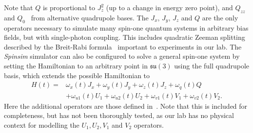 \documentclass{jors}
\begin{document}
		Note that $ Q $ is proportional to $ J_z^2 $ (up to a change in energy zero point), and $ Q_{zz} $~\cite{hamley_spin-nematic_2012} and $ Q_0 $~\cite{di_dipolequadrupole_2010} from alternative quadrupole bases.
		The $ J_x $, $ J_y $, $ J_z $ and $ Q $ are the only operators necessary to simulate many spin-one quantum systems in arbitrary bias fields, but with single-photon coupling.
		This includes quadratic Zeeman splitting described by the Breit-Rabi formula~\cite{mockler_atomic_1961} important to experiments in our lab.
		The \emph{Spinsim} simulator can also be configured to solve a general spin-one system by setting the Hamiltonian to an arbitrary point in $ \mathfrak{su}(3) $ using the full quadrupole basis, which extends the possible Hamiltonian to
		\begin{align}
			H(t) =& \omega_x(t) J_x + \omega_y(t) J_y + \omega_z(t) J_z + \omega_q(t) Q\nonumber\\
			&+ \omega_{u1}(t) U_1 + \omega_{u2}(t) U_2 + \omega_{v1}(t) V_1 + \omega_{v2}(t) V_2.
		\end{align}
		Here the additional operators are those defined in~\cite{di_dipolequadrupole_2010}. Note that this is included for completeness, but has not been thoroughly tested, as our lab has no physical context for modelling the $ U_1, U_2, V_1 $ and $ V_2 $ operators.



		


\end{document}
